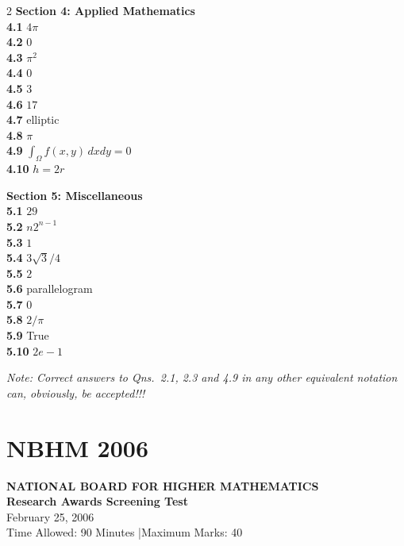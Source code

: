 \documentclass[11pt,a4paper]{article}
\newcommand{\examheader}[4]{%
  \clearpage
  \section{#1}
  \begin{center}
    {\large\bfseries NATIONAL BOARD FOR HIGHER MATHEMATICS}\\[3pt]
    {\bfseries #2}\\[2pt]
    {#3}\\[2pt]
    {\small #4}
  \end{center}
  \vspace{4pt}
}
\begin{document}
\begin{multicols}{2}
\medskip
\textbf{Section 4: Applied Mathematics}\\
\textbf{4.1} $4\pi$\\
\textbf{4.2} $0$\\
\textbf{4.3} $\pi^2$\\
\textbf{4.4} $0$\\
\textbf{4.5} $3$\\
\textbf{4.6} $17$\\
\textbf{4.7} elliptic\\
\textbf{4.8} $\pi$\\
\textbf{4.9} $\int_{\Omega} f(x, y)\,dxdy = 0$\\
\textbf{4.10} $h = 2r$

\medskip
\textbf{Section 5: Miscellaneous}\\
\textbf{5.1} $29$\\
\textbf{5.2} $n 2^{n-1}$\\
\textbf{5.3} $1$\\
\textbf{5.4} $3\sqrt{3}/4$\\
\textbf{5.5} $2$\\
\textbf{5.6} parallelogram\\
\textbf{5.7} $0$\\
\textbf{5.8} $2/\pi$\\
\textbf{5.9} True\\
\textbf{5.10} $2e - 1$

\medskip
\noindent\emph{Note: Correct answers to Qns.\ 2.1, 2.3 and 4.9 in any other equivalent notation can, obviously, be accepted!!!}
\end{multicols}
\examheader{NBHM 2006}{Research Awards Screening Test}{February 25, 2006}{Time Allowed: 90 Minutes \quad|\quad Maximum Marks: 40}
\end{document}
